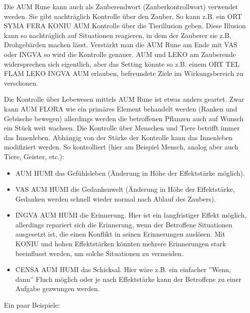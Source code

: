 \documentclass{article}
\begin{document}
Die AUM Rune kann auch als Zauberendwort (Zauberkontrollwort) verwendet werden. Sie gibt nachträglich Kontrolle über
den Zauber. So kann z.B. ein ORT SYMA FERA KONIU AUM Kontrolle über die Tierillusion geben. Diese Illusion kann so
nachträglich auf Situationen reagieren, in dem der Zauberer sie z.B. Drohgebärden machen lässt. Verstärkt man die
AUM Rune am Ende mit VAS oder INGVA so wird die Kontrolle genauer. AUM und LEKO am Zauberende widersprechen sich
eigentlich, aber das Setting könnte so z.B. einem ORT TEL FLAM LEKO INGVA AUM erlauben, befreundete Ziele im
Wirkungsbereich zu verschonen.

Die Kontrolle über Lebewesen mittels AUM Rune ist etwas anders geartet. Zwar kann AUM FLORA wie ein primäres Element
behandelt werden (Ranken und Gebüsche bewegen) allerdings werden die betroffenen Pflanzen auch auf Wunsch ein Stück
weit wachsen. Die Kontrolle über Menschen und Tiere betrifft immer das Innenleben. Abhängig von der Stärke der
Kontrolle kann das Innenleben modifiziert werden. So kontrolliert (hier am Beispiel Mensch, analog aber auch Tiere,
Geister, etc.):

\begin{itemize}
\item AUM HUMI das Gefühlsleben (Änderung in Höhe der Effektstärke möglich).
\item VAS AUM HUMI die Gedankenwelt (Änderung in Höhe der Effektstärke, Gedanken werden schnell wieder normal nach Ablauf des Zaubers).
\item INGVA AUM HUMI die Erinnerung. Hier ist ein langfristiger Effekt möglich, allerdings repariert sich die Erinnerung, wenn der Betroffene Situationen ausgesetzt ist, die einen Konflikt in seinen Erinnerungen auslösen. Mit KONIU und hohen Effektstärken könnten mehrere Erinnerungen stark beeinflusst werden, um solche Situationen zu vermeiden.
\item CENSA AUM HUMI das Schicksal. Hier wäre z.B. ein einfacher ''Wenn, dann'' Fluch möglich oder je nach Effektstärke kann der Betroffene zu einer Aufgabe gezwungen werden.
\end{itemize}

Ein paar Beispiele:
\end{document}
